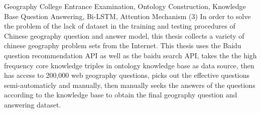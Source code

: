 \begin{englishabstract}{Geography College Entrance Examination, Ontology Construction, Knowledge Base Question Answering, Bi-LSTM, Attention Mechanism}
(3) In order to solve the problem of the lack of dataset in the training and testing procedures of Chinese geography question and answer model, this thesis collects a variety of chinese geography problem sets from the Internet. This thesis uses the Baidu question recommendation API as well as the baidu search API, takes the the high frequency core knowledge triples in ontology knowledge base as data source, then has access to 200,000 web geography questions, picks out the effective questions semi-automaticly and manually, then manually seeks the answers of the questions according to the knowledge base to obtain the final geography question and answering dataset.

\end{englishabstract}